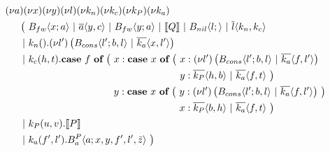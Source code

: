 \begin{align*}
  &\anew{a}{\anew{x}{\anew{y}{\anew{l}{\anew{k_n}{\anew{k_c}{\anew{k_P}{\anew{k_a}{ \\
    &\hspace{0.5cm}
    \begin{aligned}[t]
      \big(\ &\ains{B_{fw}}{x}{a}
      \apar   \asnd{a}{y,c}
      \apar   \ains{B_{fw}}{y}{a}
      \apar   \encMJtoAP{Q}
      \apar   \ains{B_{nil}}{l}{}
      \apar   \asnd{l}{k_n,k_c}
      \\
      \apar  &\arcv{k_n}{} . \anew{l'}{\parens{\ains{B_{cons}}{l'}{b, l} \apar \asnd{k_a}{x, l'}}}
      \\
      \apar  &\arcv{k_c}{h,t} .
        \begin{aligned}[t]
          \acse*{f}{\ 
            &\aalt{x}{
              \begin{aligned}[t]
                \acse*{x}{\ 
                  &\aalt{x}{\anew*{l'}{
                    \ains{B_{cons}}{l'}{b,l} \apar \asnd{k_a}{f,l'}
                  }}\\
                  &\aalt{y}{
                    \asnd{k_P}{h,b} \apar \asnd{k_a}{f,t}
                  }\ 
                }
              \end{aligned}
            }\\
            &\aalt{y}{
              \begin{aligned}[t]
                \acse*{x}{\ 
                  &\aalt{y}{\anew*{l'}{
                    \ains{B_{cons}}{l'}{b,l} \apar \asnd{k_a}{f,l'}
                  }}\\
                  &\aalt{x}{
                    \asnd{k_P}{b,h} \apar \asnd{k_a}{f,t}
                  }\ 
                }
              \end{aligned}
            }\ 
          }
        \end{aligned}
      \\
      \apar  &\arcv{k_P}{u,v} . \encMJtoAP{P}
      \\
      \apar  &\arcv{k_a}{f',l'} . \ains{B_a^P}{a}{x, y, f', l',\tilde{z}}
      \ \big)
    \end{aligned}
  }}}}}}}}
\end{align*}


